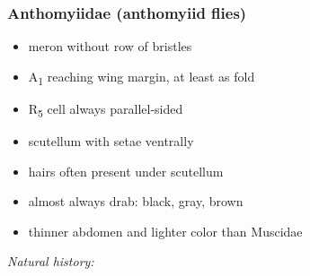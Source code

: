 \documentclass[letterpaper, 11pt]{article}
\begin{document}
\subsubsection{Anthomyiidae (anthomyiid flies)}
\begin{itemize}
\item meron without row of bristles
\item \texorpdfstring{A\textsubscript{1}}{A1} reaching wing margin, at least as fold
\item \texorpdfstring{R\textsubscript{5}}{R5} cell always parallel-sided
\item scutellum with setae ventrally 
\item hairs often present under scutellum
\item almost always drab: black, gray, brown
\item thinner abdomen and lighter color than Muscidae
\end{itemize}

\noindent{}\textit{Natural history:} \\
\end{document}
